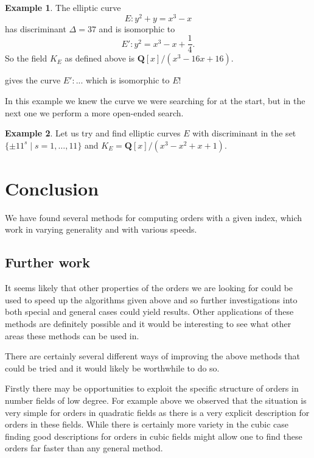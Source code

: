 \documentclass[12pt,a4paper,abstracton,bibtotoc]{scrreprt}
\theoremstyle{definition}
\newtheorem{ex}{Example}
\newcommand{\QQ}{\mathbf{Q}}
\begin{document}

\begin{ex}
The elliptic curve
\[
E\colon y^2 + y = x^3 - x
\]
has discriminant $\Delta = 37$ and is isomorphic to
\[
E'\colon y^2 = x^3 - x + \frac{1}{4}.
\]
So the field $K_E$ as defined above is $\QQ[x]/(x^3 - 16x + 16)$.

gives the curve $E'\colon ...$ which is isomorphic to $E$!%
\end{ex}

In this example we knew the curve we were searching for at the start, but in the next one we perform a more open-ended search.

\begin{ex}
Let us try and find elliptic curves $E$ with discriminant in the set $\{\pm 11^s\mid s = 1,\ldots,11\}$ and $K_E = \QQ[x]/(x^3 - x^2 + x + 1)$.
\end{ex}

\chapter{Conclusion}
We have found several methods for computing orders with a given index, which work in varying generality and with various speeds.

\section{Further work}
It seems likely that other properties of the orders we are looking for could be used to speed up the algorithms given above and so further investigations into both special and general cases could yield results.
Other applications of these methods are definitely possible and it would be interesting to see what other areas these methods can be used in.

There are certainly several different ways of improving the above methods that could be tried and it would likely be worthwhile to do so.

Firstly there may be opportunities to exploit the specific structure of orders in number fields of low degree.
For example above we observed that the situation is very simple for orders in quadratic fields as there is a very explicit description for orders in these fields.
While there is certainly more variety in the cubic case finding good descriptions for orders in cubic fields might allow one to find these orders far faster than any general method.
\end{document}
